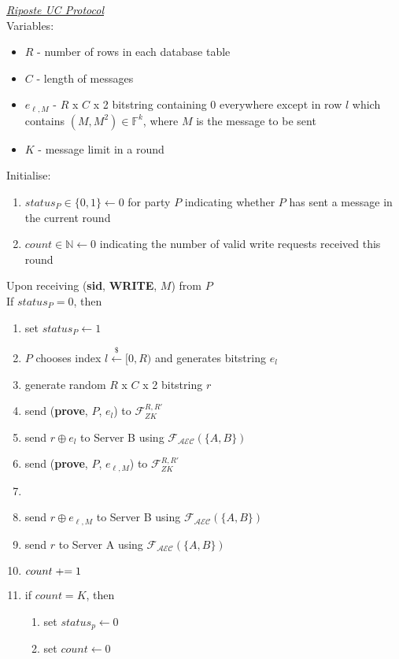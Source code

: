 \begin{tcolorbox}[colback=white, arc=5pt]
\noindent\emph{\underline{Riposte UC Protocol}}\\[5pt]
Variables:
\begin{itemize}
    \item $R$ - number of rows in each database table
    \item $C$ - length of messages
    \item $e_{\ell,M}$ - $R$ x $C$ x 2 bitstring containing 0 everywhere except in row $l$ which contains $(M, M^2)\in \mathbb{F}^k$, where $M$ is the message to be sent
    \item $K$ - message limit in a round
\end{itemize}
 Initialise:
 \begin{enumerate}
     \item $status_P\in\{0,1\}\leftarrow 0$ for party $P$ indicating whether $P$ has sent a message in the current round
     \item $count\in\mathbb{N}\leftarrow 0$ indicating the number of valid write requests received this round
 \end{enumerate}
 
 
\extitem Upon receiving (\textbf{sid}, \textbf{WRITE}, $M$) from $P$\\
If $status_P=0$, then
\begin{enumerate}
    \item set $status_P\leftarrow 1$
    \item $P$ chooses index $l \overset{{\scriptscriptstyle\$}}{\leftarrow} [0,R)$ and generates bitstring $e_l$
    \item generate random $R$ x $C$ x 2 bitstring $r$
    \item send (\textbf{prove}, $P$, $e_l$) to $\mathcal{F}_{ZK}^{R,R'}$
    \item send $r\oplus e_l$ to Server B using $\mathcal{F}_{\mathcal{AEC}}(\{A,B\})$
    \item send (\textbf{prove}, $P$, $e_{\ell,M}$) to $\mathcal{F}_{ZK}^{R,R'}$
    \item 
    \item send $r\oplus e_{\ell,M}$ to Server B using $\mathcal{F}_{\mathcal{AEC}}(\{A,B\})$
    \item send $r$ to Server A using $\mathcal{F}_{\mathcal{AEC}}(\{A,B\})$
    
    \item $count \mathrel{+}= 1$
    \item if $count=K$, then
    \begin{enumerate}
        \item set $status_p\leftarrow0$
        \item set $count \leftarrow 0$
    \end{enumerate}
\end{enumerate}


\end{tcolorbox}
